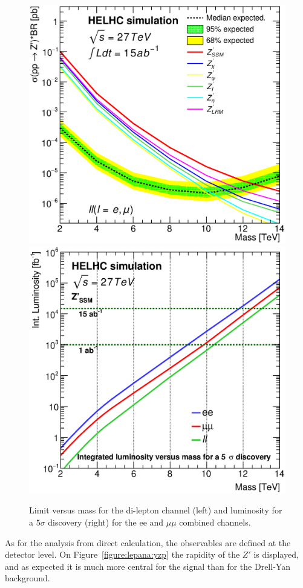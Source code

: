 \begin{figure}[!htb]
  \centering
  \includegraphics[width=0.45\columnwidth]{Fig/lim_Zprime_ll_helhc_v01_allxs.eps}
  \includegraphics[width=0.45\columnwidth]{Fig/DiscoveryPotential_ll_comb_rootStyle.eps}
  \caption{Limit versus mass for the di-lepton channel (left) and luminosity for a $5\sigma$ discovery (right) for the ee and $\mu\mu$ combined channels. }
  \label{figure:lepana:limdisc}
\end{figure}


\label{subsubsection:vardef}

As for the analysis from direct calculation, the observables are defined at the detector level. On Figure~\ref{figure:lepana:yzp} the 
rapidity of the $Z'$ is displayed, and as expected it is much more central for the signal than for the Drell-Yan background.


